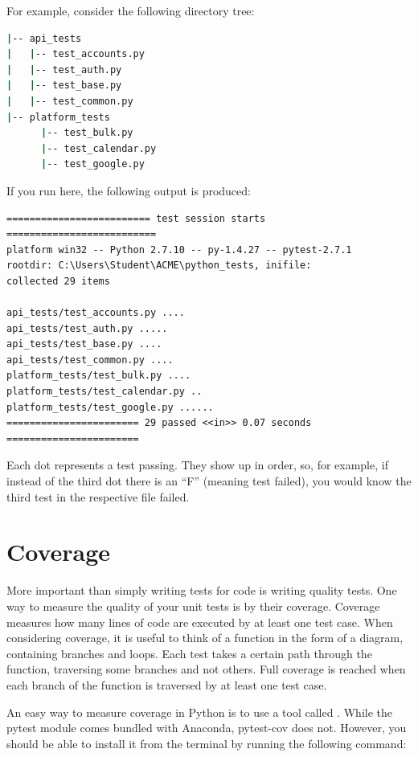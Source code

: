 For example, consider the following directory tree:

\begin{lstlisting}[language=bash]
|-- api_tests
|   |-- test_accounts.py
|   |-- test_auth.py
|   |-- test_base.py
|   |-- test_common.py
|-- platform_tests
      |-- test_bulk.py
      |-- test_calendar.py
      |-- test_google.py
\end{lstlisting}

If you run  here, the following output is produced:

\begin{lstlisting}
========================= test session starts ==========================
platform win32 -- Python 2.7.10 -- py-1.4.27 -- pytest-2.7.1
rootdir: C:\Users\Student\ACME\python_tests, inifile:
collected 29 items

api_tests/test_accounts.py ....
api_tests/test_auth.py .....
api_tests/test_base.py ....
api_tests/test_common.py ....
platform_tests/test_bulk.py ....
platform_tests/test_calendar.py ..
platform_tests/test_google.py ......
======================= 29 passed <<in>> 0.07 seconds =======================
\end{lstlisting}

Each dot represents a test passing. They show up in order, so, for example, if instead of the third dot there is an ``F'' (meaning test failed), you would know the third test in the respective file failed.

\section*{Coverage} %

More important than simply writing tests for code is writing quality tests. One way to measure the quality of your unit tests is by their coverage. Coverage measures how many lines of code are executed by at least one test case.
When considering coverage, it is useful to think of a function in the form of a diagram, containing branches and loops. Each test takes a certain path through the function, traversing some branches and not others. Full coverage is reached when each branch of the function is traversed by at least one test case.

An easy way to measure coverage in Python is to use a tool called  . While the pytest module comes bundled with Anaconda, pytest-cov does not.  However, you should be able to install it from the terminal by running the following command:

